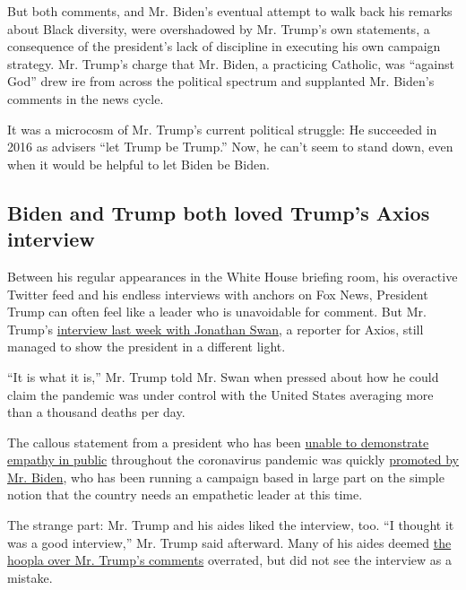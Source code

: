 But both comments, and Mr. Biden's eventual attempt to walk back his
remarks about Black diversity, were overshadowed by Mr. Trump's own
statements, a consequence of the president's lack of discipline in
executing his own campaign strategy. Mr. Trump's charge that Mr. Biden,
a practicing Catholic, was ``against God'' drew ire from across the
political spectrum and supplanted Mr. Biden's comments in the news
cycle.

It was a microcosm of Mr. Trump's current political struggle: He
succeeded in 2016 as advisers ``let Trump be Trump.'' Now, he can't seem
to stand down, even when it would be helpful to let Biden be Biden.

\hypertarget{biden-and-trump-both-loved-trumps-axios-interview}{%
\subsection{Biden and Trump both loved Trump's Axios
interview}\label{biden-and-trump-both-loved-trumps-axios-interview}}

Between his regular appearances in the White House briefing room, his
overactive Twitter feed and his endless interviews with anchors on Fox
News, President Trump can often feel like a leader who is unavoidable
for comment. But Mr. Trump's
\href{https://www.axios.com/full-axios-hbo-interview-donald-trump-cd5a67e1-6ba1-46c8-bb3d-8717ab9f3cc5.html}{interview
last week with Jonathan Swan}, a reporter for Axios, still managed to
show the president in a different light.

``It is what it is,'' Mr. Trump told Mr. Swan when pressed about how he
could claim the pandemic was under control with the United States
averaging more than a thousand deaths per day.

The callous statement from a president who has been
\href{https://www.nytimes.com/2020/07/28/us/politics/donald-fred-trump.html}{unable
to demonstrate empathy in public} throughout the coronavirus pandemic
was quickly
\href{https://www.instagram.com/p/CDe2axiFopA/?igshid=1n57idhulpl2m}{promoted
by Mr. Biden}, who has been running a campaign based in large part on
the simple notion that the country needs an empathetic leader at this
time.

The strange part: Mr. Trump and his aides liked the interview, too. ``I
thought it was a good interview,'' Mr. Trump said afterward. Many of his
aides deemed
\href{https://www.nytimes.com/2020/08/04/us/politics/trump-john-lewis-axios.html}{the
hoopla over Mr. Trump's comments} overrated, but did not see the
interview as a mistake.

